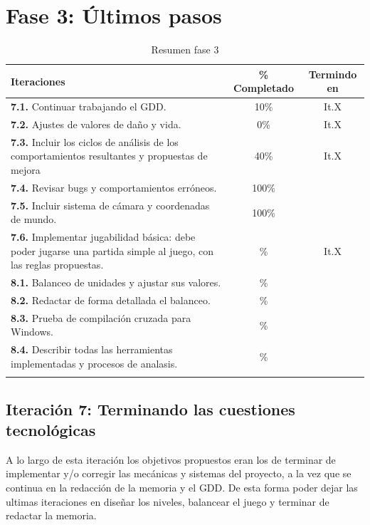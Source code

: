 \section{Fase 3: Últimos pasos}
\begin{longtable}[c]{|p{7cm}|c|c|}
\hline
Iteraciones                                                & \% Completado & Termindo en \\ 
\hline
\endhead
\textbf{7.1.} Continuar trabajando el GDD.                 & 10\% & It.X  \\
	\cmidrule[.003pt]{1-3}
\textbf{7.2.} Ajustes de valores de daño y vida.           &  0\% & It.X  \\ 
	\cmidrule[.003pt]{1-3}
\textbf{7.3.} Incluir los ciclos de análisis de los 
				comportamientos resultantes y 
				propuestas de mejora                       & 40\% & It.X  \\ 
	\cmidrule[.003pt]{1-3}
\textbf{7.4.} Revisar bugs y comportamientos erróneos.     & 100\% & \\
	\cmidrule[.003pt]{1-3}
\textbf{7.5.} Incluir sistema de cámara y coordenadas 
				de mundo.                                  & 100\% & \\
	\cmidrule[.003pt]{1-3}
\textbf{7.6.} Implementar jugabilidad básica: debe poder
				jugarse una partida simple al juego, con
				las reglas propuestas.                     & \% & It.X  \\

		\cmidrule[1pt]{1-3}

\textbf{8.1.} Balanceo de unidades y ajustar sus valores.  & \% &  \\
	\cmidrule[.003pt]{1-3}
\textbf{8.2.} Redactar de forma detallada el balanceo.     & \% &  \\
	\cmidrule[.003pt]{1-3}
\textbf{8.3.} Prueba de compilación cruzada para Windows.  & \% &  \\
	\cmidrule[.003pt]{1-3}
\textbf{8.4.} Describir todas las herramientas implementadas
				y procesos de analasis.                    & \% &  \\
\hline
\caption{Resumen fase 3}
\end{longtable}

\subsection*{Iteración 7: Terminando las cuestiones tecnológicas}
A lo largo de esta iteración los objetivos propuestos eran los de terminar de implementar y/o corregir
las mecánicas y sistemas del proyecto, a la vez que se continua en la redacción de la memoria y el GDD.
De esta forma poder dejar las ultimas iteraciones en diseñar los niveles, balancear el juego y terminar
de redactar la memoria.

